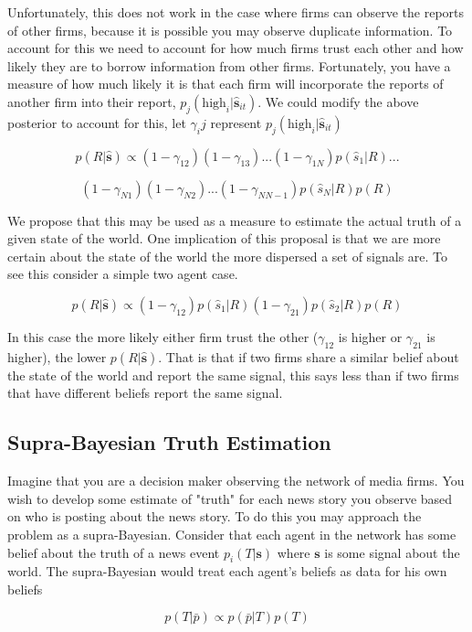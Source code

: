 \documentclass[a4paper]{article}
\begin{document}
 Unfortunately, this does not work in the case where firms can observe the reports of other firms, because it is possible you may observe duplicate information.  To account for this we need to account for how much firms trust each other and how likely they are to borrow information from other firms.  Fortunately, you have a measure of how much likely it is that each firm will incorporate the reports of another firm into their report, $p_j(\text{high}_i|\hat{\textbf{s}}_{it})$.  We could modify the above posterior to account for this, let $\gamma_ij$ represent $p_j(\text{high}_i|\hat{\textbf{s}}_{it})$
 
 \[p(R|\hat{\textbf{s}}) \propto (1-\gamma_{12})(1-\gamma_{13})...(1-\gamma_{1N})p(\hat{s}_1|R)...\]
 
 \[(1-\gamma_{N1})(1-\gamma_{N2})...(1-\gamma_{NN-1})p(\hat{s}_N|R)p(R)\]
 
 We propose that this may be used as a measure to estimate the actual truth of a given state of the world.
  One implication of this proposal is that we are more certain about the state of the world the more dispersed a set of signals are.  To see this consider a simple two agent case.

\[p(R|\hat{\textbf{s}}) \propto (1-\gamma_{12})p(\hat{s}_1|R)(1-\gamma_{21})p(\hat{s}_2|R)p(R)\]

In this case the more likely either firm trust the other ($\gamma_{12}$ is higher or $\gamma_{21}$ is higher), the lower $p(R|\hat{\textbf{s}})$.  That is that if two firms share a similar belief about the state of the world and report the same signal, this says less than if two firms that have different beliefs report the same signal.

\subsection{Supra-Bayesian Truth Estimation}

Imagine that you are a decision maker observing the network of media firms.  You wish to develop some estimate of "truth" for each news story you observe based on who is posting about the news story.  To do this you may approach the problem as a supra-Bayesian.  Consider that each agent in the network has some belief about the truth of a news event $p_i(T | \textbf{s})$ where $\textbf{s}$ is some signal about the world.  The supra-Bayesian would treat each agent's beliefs as data for his own beliefs

\[p(T | \bar{p}) \propto p(\bar{p} | T) p(T)\]
\end{document}
